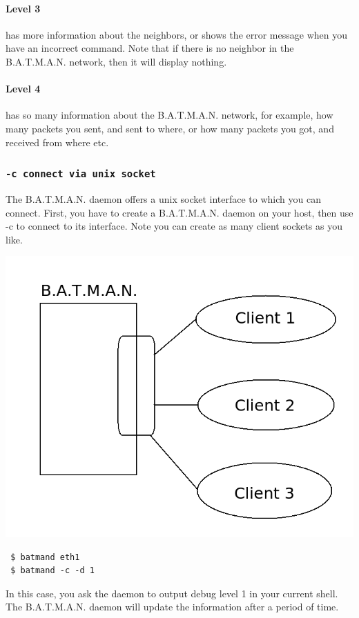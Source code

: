 \documentclass[
	12pt,
	a4paper,
	twoside,
	english,
	headsepline,
	footnosepline,
	automark,
	normalheadings,
	openany,
	cleardoubleplain,
	abstracton,
	idxtotoc,
	liststotoc,
	bibtotoc,
 	BCOR8mm,
]{scrartcl}
\newcommand{\subsubsectionttt}[1]{\subsubsection{\texttt{#1}}}
\begin{document}
\paragraph*{Level 3}
has more information about the neighbors, or shows the error message when you have an incorrect command. Note that if there is no neighbor in the B.A.T.M.A.N. network, then it will display nothing.

\paragraph*{Level 4}
has so many information about the B.A.T.M.A.N. network, for example, how many packets you sent, and sent to where, or how many packets you got, and received from where etc.

\subsubsectionttt{-c connect via unix socket}
The B.A.T.M.A.N. daemon offers a unix socket interface to which you can connect. First, you have to create a B.A.T.M.A.N. daemon on your host, then use -c to connect to its interface. Note you can create as many client sockets as you like.

\begin{center}
\includegraphics[scale=0.5]{multiple_clients}
\end{center}

\begin{verbatim}
 $ batmand eth1
 $ batmand -c -d 1
\end{verbatim}
 In this case, you ask the daemon to output debug level 1 in your current shell. The B.A.T.M.A.N. daemon will update the information after a period of time.
\end{document}
